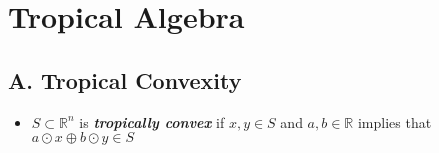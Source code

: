 \documentclass{article}
\begin{document}
\section*{Tropical Algebra}

\subsection*{A. Tropical Convexity}

\begin{itemize}
	\item \( S \subset \mathbb{R}^n \) is \textbf{\textit{tropically convex}} if \( x,y \in S \) and \( a,b \in \mathbb{R} \) implies that \( a \odot x \oplus b \odot y \in S \)
\end{itemize}
\end{document}
